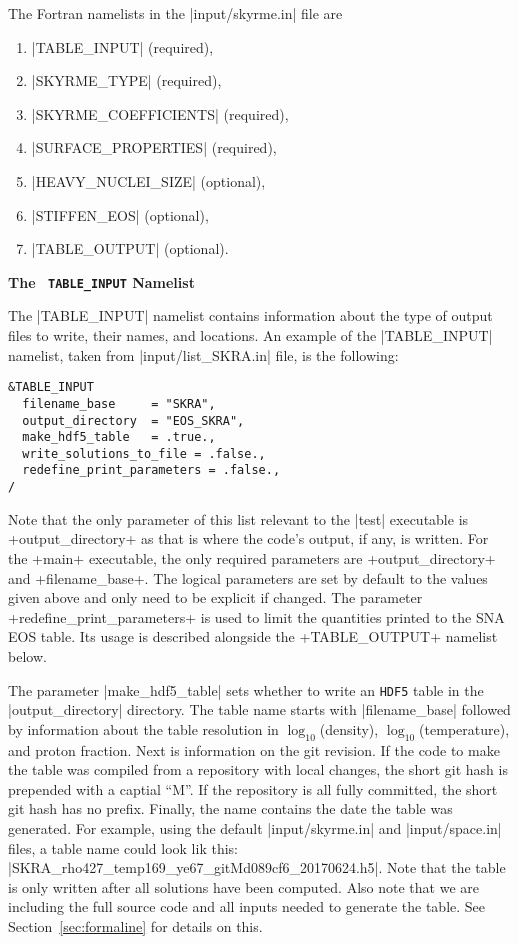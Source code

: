 \documentclass[letterpaper,11pt]{refart}
\begin{document}
The Fortran namelists in the \verbfile|input/skyrme.in| file are
\begin{enumerate}
 \item \verbnml|TABLE_INPUT| (required),
 \item \verbnml|SKYRME_TYPE| (required),
 \item \verbnml|SKYRME_COEFFICIENTS| (required),
 \item \verbnml|SURFACE_PROPERTIES| (required),
 \item \verbnml|HEAVY_NUCLEI_SIZE| (optional), 
 \item \verbnml|STIFFEN_EOS| (optional),
 \item \verbnml|TABLE_OUTPUT| (optional).
\end{enumerate}

\bigskip

\textbf{The \texttt{\color{cyan} TABLE\_INPUT} Namelist}


The \verbnml|TABLE_INPUT| namelist contains information about the type
of output files to write, their names, and locations.  An example of
the \verbnml|TABLE_INPUT| namelist, taken from
\verbfile|input/list_SKRA.in| file, is the following:

{\color{cyan}
\begin{verbatim}
&TABLE_INPUT
  filename_base     = "SKRA",
  output_directory  = "EOS_SKRA",
  make_hdf5_table   = .true.,
  write_solutions_to_file = .false.,
  redefine_print_parameters = .false.,
/
\end{verbatim}}
Note that the only parameter of this list relevant to the
\verbexec|test| executable is \verbprm+output_directory+ as that is
where the code's output, if any, is written.  For the \verbexec+main+
executable, the only required parameters are
\verbprm+output_directory+ and
\verbprm+filename_base+. The logical parameters are set by default to
the values given above and only need to be explicit if changed. The
parameter \verbprm+redefine_print_parameters+ is used to limit the
quantities printed to the SNA EOS table. Its usage is described
alongside the \verbnml+TABLE_OUTPUT+ namelist below.


The parameter \verbprm|make_hdf5_table| sets whether to write an 
\verb|HDF5| table in the \verbfile|output_directory| directory.  
The table name starts with \verbprm|filename_base| followed by 
information about the table resolution in $\log_{10}$(density), 
$\log_{10}$(temperature), and proton fraction. Next is information on 
the git revision. If the code to make the table was compiled from a 
repository with local changes, the short git hash is prepended with a 
captial ``M''. If the repository is all fully committed, the short git 
hash has no prefix. Finally, the name contains the date the table was
generated. For example, using the default
\verbfile|input/skyrme.in| and \verbfile|input/space.in| files,
a table name could look lik this:
\verbfile|SKRA_rho427_temp169_ye67_gitMd089cf6_20170624.h5|.  Note
that the table is only written after all solutions have been
computed. Also note that we are including the full source code and all
inputs needed to generate the table. See Section~\ref{sec:formaline}
for details on this. 
\end{document}
